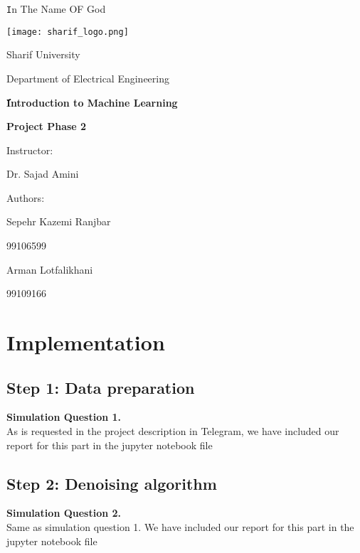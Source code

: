 \documentclass[11pt,a4paper]{article}
\begin{document}
	\begin{titlepage}	
		\centering
		\centering
	{\texttt In The Name OF God}
	
	\vspace{0.50cm}
	\texttt{[image: sharif\_logo.png]}
	
	\vspace{0.35cm}
	\Large
	Sharif University
	
	\vspace{0.30cm}
	\large
	Department of Electrical Engineering
	
	\vspace{1cm}
	\huge
	\textbf{ََََIntroduction to Machine Learning}
	
	\vspace{0.4cm}
	\textbf{Project Phase 2}
	
	\vspace{2cm}
	\Large
	Instructor:
	\vspace{0.2cm}
	
	Dr. Sajad Amini
	
	\vspace{3cm}
	Authors:
	\vspace{0.2cm}
	
	Sepehr Kazemi Ranjbar
	
	\vspace{0.2cm} 
	99106599
	
	\vspace{0.4cm}
	Arman Lotfalikhani
	
	\vspace{0.2cm} 
	99109166
		
	\end{titlepage}
	\restoregeometry
	\setcounter{section}{1}
	\section{Implementation}
	\subsection*{Step 1: Data preparation}
	\color{ForestGreen}
	\large{\textbf{Simulation Question 1.}} 
	\color{black}
	\\
 As is requested in the project description in Telegram, we have included our report for this part in the jupyter notebook file
 	\subsection*{Step 2: Denoising algorithm}
	\color{ForestGreen}
	\large{\textbf{Simulation Question 2.}} 
	\color{black}
	\\
 Same as simulation question 1. We have included our report for this part in the jupyter notebook file
 
\end{document}
